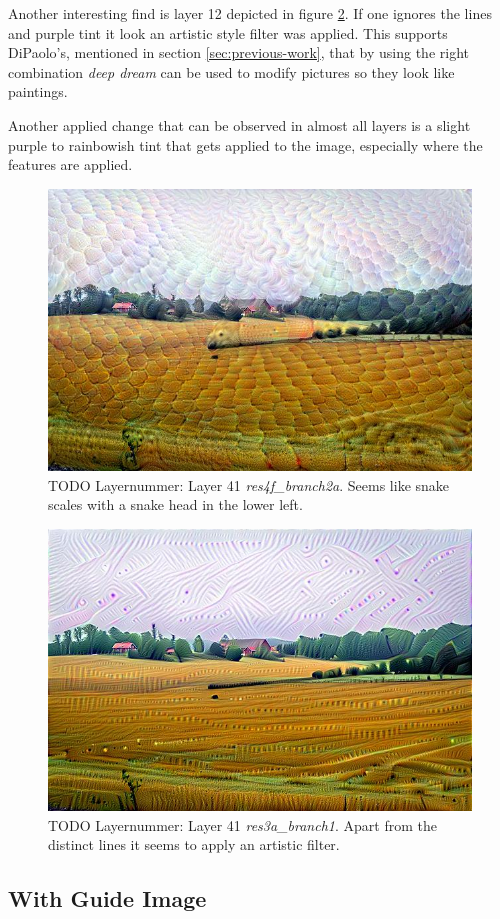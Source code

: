 Another interesting find is layer 12 depicted in figure \ref{fig:layer-artistic}. If one ignores the lines and purple tint it look an artistic style filter was applied. This supports DiPaolo's, mentioned in section \ref{sec:previous-work}, that by using the right combination \textit{deep dream} can be used to modify pictures so they look like paintings.

Another applied change that can be observed in almost all layers is a slight purple to rainbowish tint that gets applied to the image, especially where the features are applied.

\begin{figure}[H]
	\centering
	\includegraphics[width=0.5\linewidth]{img/alpsted-landscape_res4f_branch2a.jpg}
	\caption{TODO Layernummer: Layer 41 \emph{res4f\_branch2a}. Seems like snake scales with a snake head in the lower left.}
	\label{fig:layer-snake}
\end{figure}
\begin{figure}[H]
\centering
\includegraphics[width=0.5\linewidth]{img/alpsted-landscape_res3a_branch1.jpg}
\caption{TODO Layernummer: Layer 41 \emph{res3a\_branch1}. Apart from the distinct lines it seems to apply an artistic filter.}
\label{fig:layer-artistic}
\end{figure}


\subsection{With Guide Image}
\label{sec:withguide}
